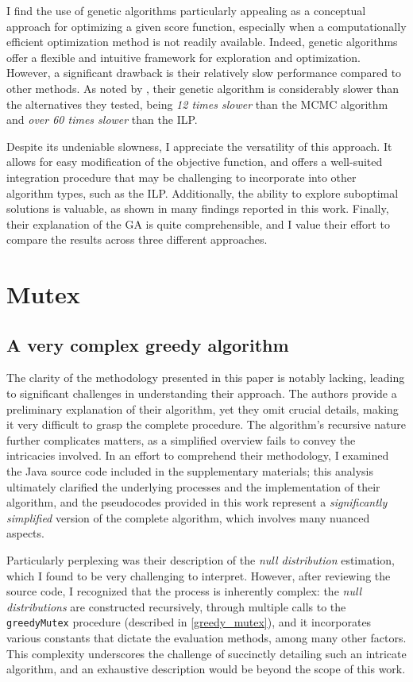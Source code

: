 I find the use of genetic algorithms particularly appealing as a conceptual approach for optimizing a given score function, especially when a computationally efficient optimization method is not readily available. Indeed, genetic algorithms offer a flexible and intuitive framework for exploration and optimization. However, a significant drawback is their relatively slow performance compared to other methods. As noted by \textcite{mdpfinder}, their genetic algorithm is considerably slower than the alternatives they tested, being \textit{12 times slower} than the MCMC algorithm and \textit{over 60 times slower} than the ILP.

Despite its undeniable slowness, I appreciate the versatility of this approach. It allows for easy modification of the objective function, and offers a well-suited integration procedure that may be challenging to incorporate into other algorithm types, such as the ILP. Additionally, the ability to explore suboptimal solutions is valuable, as shown in many findings reported in this work. Finally, their explanation of the GA is quite comprehensible, and I value their effort to compare the results across three different approaches.

\section{Mutex}

\subsection{A very complex greedy algorithm}

The clarity of the methodology presented in this paper is notably lacking, leading to significant challenges in understanding their approach. The authors provide a preliminary explanation of their algorithm, yet they omit crucial details, making it very difficult to grasp the complete procedure. The algorithm's recursive nature further complicates matters, as a simplified overview fails to convey the intricacies involved. In an effort to comprehend their methodology, I examined the Java source code included in the supplementary materials; this analysis ultimately clarified the underlying processes and the implementation of their algorithm, and the pseudocodes provided in this work represent a \textit{significantly simplified} version of the complete algorithm, which involves many nuanced aspects.

Particularly perplexing was their description of the \textit{null distribution} estimation, which I found to be very challenging to interpret. However, after reviewing the source code, I recognized that the process is inherently complex: the \textit{null distributions} are constructed recursively, through multiple calls to the \texttt{greedyMutex} procedure (described in \cref{greedy_mutex}), and it incorporates various constants that dictate the evaluation methods, among many other factors. This complexity underscores the challenge of succinctly detailing such an intricate algorithm, and an exhaustive description would be beyond the scope of this work.

